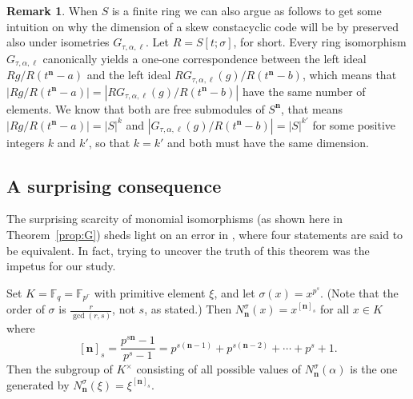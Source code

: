 \documentclass[11pt]{amsart}
\theoremstyle{plain}
\theoremstyle{definition}
\newtheorem{remark}[theorem]{Remark}
\numberwithin{equation}{section}
\numberwithin{figure}{section}
\newcommand{\field}{K}
\newcommand{\Stsigma}{S[t;\sigma]}
\newcommand{\de}{\mathbf{n}}  %
\begin{document}
\begin{remark}
When $S$ is a finite ring we can also argue as follows to get some intuition on why the dimension of a skew constacyclic code will be by preserved also under isometries $G_{\tau,\alpha,\ell}$. Let $R=\Stsigma$, for short.  Every ring isomorphism $G_{\tau,\alpha,\ell}$ canonically yields a one-one correspondence between the left ideal $Rg/R(t^\mathbf{n} -a)$ and the left ideal $RG_{\tau,\alpha,\ell}(g)/R(t^\mathbf{n}-b)$, which means that $|Rg/R(t^\mathbf{n}-a)|=|R G_{\tau,\alpha,\ell}(g)/R(t^\mathbf{n}-b)|$ have the same number of elements. We know that both are free submodules of $S^{\mathbf{n}}$, that means $|Rg/R(t^\mathbf{n} -a)|=|S|^k$ and $|G_{\tau,\alpha,\ell}(g)/R(t^\mathbf{n} -b)|=|S|^{k'}$ for some positive integers $k$ and $k'$, so that $k=k'$ and both must have the same dimension.
\end{remark}


\subsection{A surprising consequence}


The surprising scarcity of monomial isomorphisms (as shown here in Theorem~\ref{prop:G})  sheds light on an error in  \cite[Theorem 4]{OuazzouNajmeddineAydin2025}, where four statements are said to be equivalent.  In fact, trying to uncover the truth of this theorem was the impetus for our study.

Set $\field=\mathbb{F}_q=\mathbb{F}_{p^r}$ with primitive element $\xi$, and let  $\sigma(x)=x^{p^s}$. (Note that the order of $\sigma$ is $\frac{r}{\gcd (r,s)}$, not $s$, as stated.)
Then $N_{\de}^\sigma(x)=x^{[\de]_{s}}$ for all $x\in \field$ where
$$
[\de]_{s}=\frac{p^{s\de}-1}{p^{s}-1}=p^{s(\de-1)}+p^{s(\de-2)}+\cdots + p^{s} + 1.
$$
Then the subgroup of $\field^\times$ consisting of all possible values of $N_{\de}^\sigma(\alpha)$ is the one generated by $N_{\de}^\sigma(\xi)=\xi^{[\de]_{s}}$.
\end{document}
